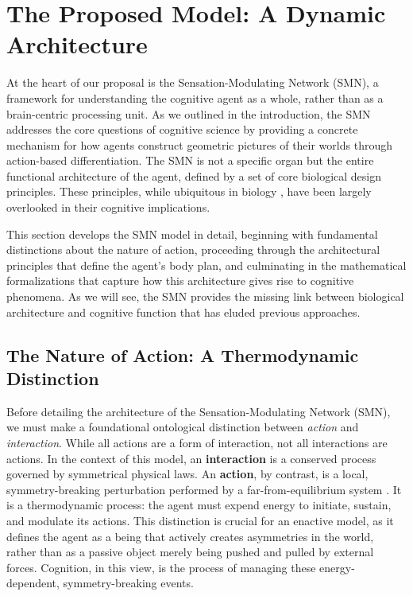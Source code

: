 \section{The Proposed Model: A Dynamic Architecture}
\label{sec:model}
At the heart of our proposal is the Sensation-Modulating Network (SMN), a framework for understanding the cognitive agent as a whole, rather than as a brain-centric processing unit. As we outlined in the introduction, the SMN addresses the core questions of cognitive science by providing a concrete mechanism for how agents construct geometric pictures of their worlds through action-based differentiation. The SMN is not a specific organ but the entire functional architecture of the agent, defined by a set of core biological design principles. These principles, while ubiquitous in biology \cite{hyman1940invertebrates}, have been largely overlooked in their cognitive implications.

This section develops the SMN model in detail, beginning with fundamental distinctions about the nature of action, proceeding through the architectural principles that define the agent's body plan, and culminating in the mathematical formalizations that capture how this architecture gives rise to cognitive phenomena. As we will see, the SMN provides the missing link between biological architecture and cognitive function that has eluded previous approaches.

\subsection{The Nature of Action: A Thermodynamic Distinction}
\label{subsec:action_nature}
Before detailing the architecture of the Sensation-Modulating Network (SMN), we must make a foundational ontological distinction between \textit{action} and \textit{interaction}. While all actions are a form of interaction, not all interactions are actions. In the context of this model, an \textbf{interaction} is a conserved process governed by symmetrical physical laws. An \textbf{action}, by contrast, is a local, symmetry-breaking perturbation performed by a far-from-equilibrium system \cite{prigogine2018order}. It is a thermodynamic process: the agent must expend energy to initiate, sustain, and modulate its actions. This distinction is crucial for an enactive model, as it defines the agent as a being that actively creates asymmetries in the world, rather than as a passive object merely being pushed and pulled by external forces. Cognition, in this view, is the process of managing these energy-dependent, symmetry-breaking events.

